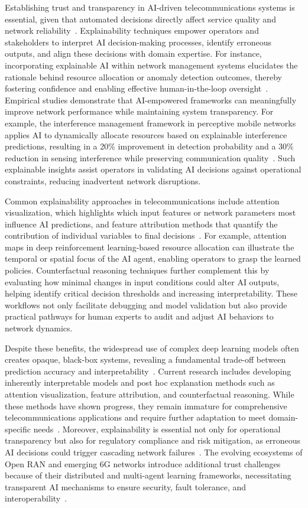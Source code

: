 \documentclass[sigconf]{acmart}
\begin{document}
Establishing trust and transparency in AI-driven telecommunications systems is essential, given that automated decisions directly affect service quality and network reliability~\cite{ref7,ref48,ref50,ref54}. Explainability techniques empower operators and stakeholders to interpret AI decision-making processes, identify erroneous outputs, and align these decisions with domain expertise. For instance, incorporating explainable AI within network management systems elucidates the rationale behind resource allocation or anomaly detection outcomes, thereby fostering confidence and enabling effective human-in-the-loop oversight~\cite{ref7}. Empirical studies demonstrate that AI-empowered frameworks can meaningfully improve network performance while maintaining system transparency. For example, the interference management framework in perceptive mobile networks applies AI to dynamically allocate resources based on explainable interference predictions, resulting in a 20\% improvement in detection probability and a 30\% reduction in sensing interference while preserving communication quality~\cite{ref48}. Such explainable insights assist operators in validating AI decisions against operational constraints, reducing inadvertent network disruptions.

Common explainability approaches in telecommunications include attention visualization, which highlights which input features or network parameters most influence AI predictions, and feature attribution methods that quantify the contribution of individual variables to final decisions~\cite{ref50}. For example, attention maps in deep reinforcement learning-based resource allocation can illustrate the temporal or spatial focus of the AI agent, enabling operators to grasp the learned policies. Counterfactual reasoning techniques further complement this by evaluating how minimal changes in input conditions could alter AI outputs, helping identify critical decision thresholds and increasing interpretability. These workflows not only facilitate debugging and model validation but also provide practical pathways for human experts to audit and adjust AI behaviors to network dynamics.

Despite these benefits, the widespread use of complex deep learning models often creates opaque, black-box systems, revealing a fundamental trade-off between prediction accuracy and interpretability~\cite{ref54}. Current research includes developing inherently interpretable models and post hoc explanation methods such as attention visualization, feature attribution, and counterfactual reasoning. While these methods have shown progress, they remain immature for comprehensive telecommunications applications and require further adaptation to meet domain-specific needs~\cite{ref50}. Moreover, explainability is essential not only for operational transparency but also for regulatory compliance and risk mitigation, as erroneous AI decisions could trigger cascading network failures~\cite{ref48}. The evolving ecosystems of Open RAN and emerging 6G networks introduce additional trust challenges because of their distributed and multi-agent learning frameworks, necessitating transparent AI mechanisms to ensure security, fault tolerance, and interoperability~\cite{ref54}. 
\end{document}
